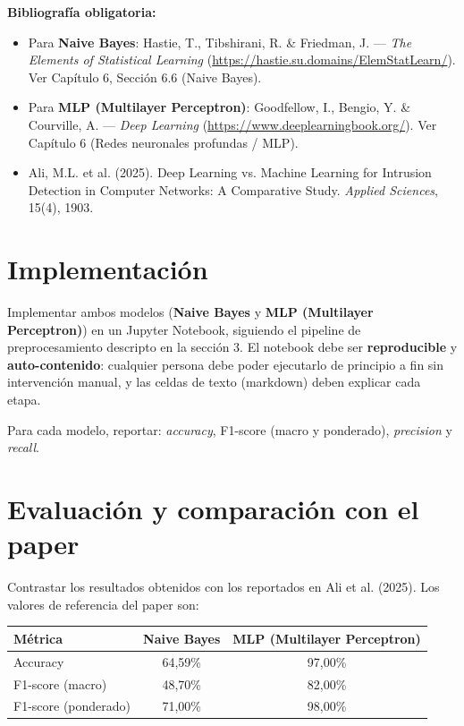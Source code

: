 \documentclass[11pt,a4paper]{article}
\begin{document}
\textbf{Bibliograf\'ia obligatoria:}
\begin{itemize}[leftmargin=2em,itemsep=2pt]
    \item Para \textbf{Naive Bayes}: Hastie, T., Tibshirani, R. \& Friedman, J. --- \textit{The Elements of Statistical Learning} (\url{https://hastie.su.domains/ElemStatLearn/}). Ver Capítulo 6, Sección 6.6 (Naive Bayes).
    \item Para \textbf{MLP (Multilayer Perceptron)}: Goodfellow, I., Bengio, Y. \& Courville, A. --- \textit{Deep Learning} (\url{https://www.deeplearningbook.org/}). Ver Capítulo 6 (Redes neuronales profundas / MLP).
    \item Ali, M.L. et al. (2025). Deep Learning vs. Machine Learning for Intrusion Detection in Computer Networks: A Comparative Study. \textit{Applied Sciences}, 15(4), 1903.
\end{itemize}

\section{Implementaci\'on}
Implementar ambos modelos (\textbf{Naive Bayes} y \textbf{MLP (Multilayer Perceptron)}) en un Jupyter Notebook, siguiendo el pipeline de preprocesamiento descripto en la secci\'on 3. El notebook debe ser \textbf{reproducible} y \textbf{auto-contenido}: cualquier persona debe poder ejecutarlo de principio a fin sin intervenci\'on manual, y las celdas de texto (markdown) deben explicar cada etapa.

Para cada modelo, reportar: \textit{accuracy}, F1-score (macro y ponderado), \textit{precision} y \textit{recall}.

\section{Evaluaci\'on y comparaci\'on con el paper}
Contrastar los resultados obtenidos con los reportados en Ali et al. (2025). Los valores de referencia del paper son:

\begin{center}
\begin{tabular}{lcc}
        \toprule
        \textbf{M\'etrica} & \textbf{Naive Bayes} & \textbf{MLP (Multilayer Perceptron)} \\
        \midrule
        Accuracy & 64,59\% & 97,00\% \\
        F1-score (macro) & 48,70\% & 82,00\% \\
        F1-score (ponderado) & 71,00\% & 98,00\% \\
        \bottomrule
\end{tabular}
\end{center}
\end{document}
